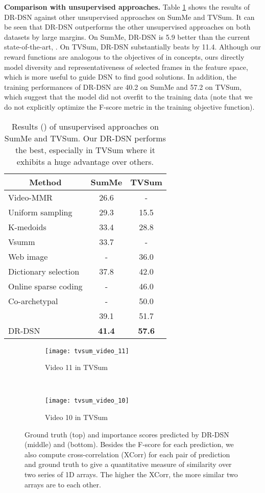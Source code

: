 \documentclass[letterpaper]{article} \usepackage{aaai18}  \usepackage{times}  \usepackage{helvet}  \usepackage{courier}  \usepackage{url}  \usepackage{graphicx}
\begin{document}
{\bf Comparison with unsupervised approaches.} Table \ref{tb:resOfUnsup} shows the results of DR-DSN against other unsupervised approaches on SumMe and TVSum. It can be seen that DR-DSN outperforms the other unsupervised approaches on both datasets by large margins. On SumMe, DR-DSN is 5.9 better than the current state-of-the-art, . On TVSum, DR-DSN substantially beats  by 11.4. Although our reward functions are analogous to the objectives of  in concepts, ours directly model diversity and representativeness of selected frames in the feature space, which is more useful to guide DSN to find good solutions. In addition, the training performances of DR-DSN are 40.2 on SumMe and 57.2 on TVSum, which suggest that the model did not overfit to the training data (note that we do not explicitly optimize the F-score metric in the training objective function).

\begin{table}[h]
\centering
\caption{Results () of unsupervised approaches on SumMe and TVSum. Our DR-DSN performs the best, especially in TVSum where it exhibits a huge advantage over others.}
\label{tb:resOfUnsup}
\begin{tabular}{l | c | c}
\hline
\multicolumn{1}{c|}{Method} & SumMe & TVSum \\
\hline
Video-MMR & 26.6 & - \\
Uniform sampling & 29.3 & 15.5 \\
K-medoids & 33.4 & 28.8 \\
Vsumm & 33.7 & - \\
Web image & - & 36.0 \\
Dictionary selection & 37.8 & 42.0 \\
Online sparse coding & - & 46.0 \\
Co-archetypal & - & 50.0 \\
 & 39.1 & 51.7 \\
\hline \hline
DR-DSN & {\bf 41.4} & {\bf 57.6} \\
\hline
\end{tabular}
\end{table}

\begin{figure*}[h]
\centering
  \begin{subfigure}[b]{0.49\textwidth}
  \texttt{[image: tvsum\_video\_11]}
  \caption{Video 11 in TVSum} \label{fig:tvsum_video_11}
  \end{subfigure}
  ~
  \begin{subfigure}[b]{0.49\textwidth}
  \texttt{[image: tvsum\_video\_10]}
  \caption{Video 10 in TVSum} \label{fig:tvsum_video_10}
  \end{subfigure}
\caption{Ground truth (top) and importance scores predicted by DR-DSN (middle) and  (bottom). Besides the F-score for each prediction, we also compute cross-correlation (XCorr) for each pair of prediction and ground truth to give a quantitative measure of similarity over two series of 1D arrays. The higher the XCorr, the more similar two arrays are to each other.}
\label{fig:IS_tvsum_videos}
\end{figure*}
\end{document}
